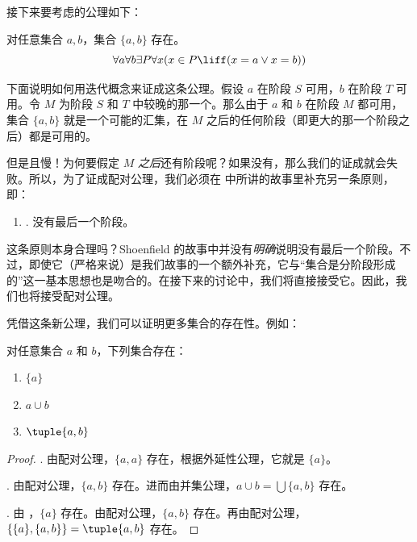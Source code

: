 \documentclass[../../../include/open-logic-section]{subfiles}
\begin{document}

接下来要考虑的公理如下：

\begin{axiom}[配对公理]
对任意集合 $a, b$，集合 $\{a, b\}$ 存在。\[
	\forall a \forall b \exists P \forall x (x \in P \liff (x = a \lor x = b))
\]
\end{axiom}

下面说明如何用迭代概念来证成这条公理。假设 $a$ 在阶段 $S$ 可用，$b$ 在阶段 $T$ 可用。令 $M$ 为阶段 $S$ 和 $T$ 中较晚的那一个。那么由于 $a$ 和 $b$ 在阶段 $M$ 都可用，集合 $\{a,b\}$ 就是一个可能的汇集，在 $M$ 之后的任何阶段（即更大的那一个阶段之后）都是可用的。

但是且慢！为何要假定 $M$ \emph{之后}还有阶段呢？如果没有，那么我们的证成就会失败。所以，为了证成配对公理，我们必须在  中所讲的故事里补充另一条原则，即：

\begin{enumerate}
	\item[] \stagessucc. 没有最后一个阶段。
\end{enumerate}

这条原则本身合理吗？Shoenfield 的故事中并没有\emph{明确}说明没有最后一个阶段。不过，即使它（严格来说）是我们故事的一个额外补充，它与“集合是分阶段形成的”这一基本思想也是吻合的。在接下来的讨论中，我们将直接接受它。因此，我们也将接受配对公理。

凭借这条新公理，我们可以证明更多集合的存在性。例如：

\begin{prop}
对任意集合 $a$ 和 $b$，下列集合存在：
	\begin{enumerate}
		\item{} $\{a\}$
		\item{} $a \cup b$
		\item{} $\tuple{a, b}$
	\end{enumerate}
\end{prop}

\begin{proof}
. 由配对公理，$\{a, a\}$ 存在，根据外延性公理，它就是 $\{a\}$。

. 由配对公理，$\{a, b\}$ 存在。进而由并集公理，$a \cup b = \bigcup
\{a, b\}$ 存在。

. 由 ，$\{a\}$ 存在。由配对公理，$\{a,
b\}$ 存在。再由配对公理，$\{\{a\}, \{a, b\}\} = \tuple{a, b}$ 存在。
\end{proof}
\end{document}

